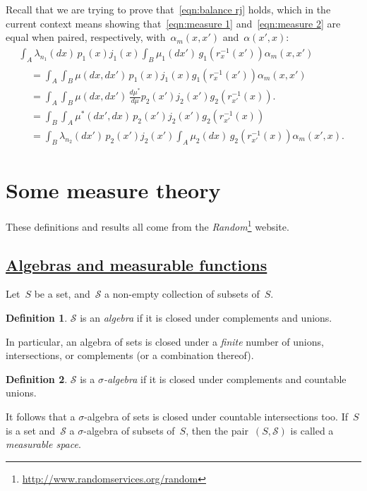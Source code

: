 \documentclass[11pt,a4paper]{article}
\newcommand\mc[1]{\mathcal{#1}}                  %
\theoremstyle{definition}
\newtheorem{defn}{Definition}
\begin{document}
Recall that we are trying to prove that~\eqref{eqn:balance rj} holds, which in
the current context means showing that~\eqref{eqn:measure 1}
and~\eqref{eqn:measure 2} are equal when paired, respectively,
with~$\alpha_m(x,x')$ and~$\alpha(x',x)$:
\begin{multline*}
  \int_A \lambda_{n_1}(dx)\,p_1(x)j_1(x)
      \int_B \mu_1(dx')\,g_1(r_x^{-1}(x'))\alpha_m(x,x') \\
  \begin{aligned}
  &= \int_A \int_B \mu(dx,dx')\,p_1(x)j_1(x)g_1(r_x^{-1}(x'))\alpha_m(x,x') \\
  &= \int_A \int_B \mu(dx,dx')\,\frac{d\mu^*}{d\mu}
      p_2(x')j_2(x')g_2(r_{x'}^{-1}(x)). \\
  &= \int_B \int_A \mu^*(dx',dx)\,p_2(x')j_2(x')g_2(r_{x'}^{-1}(x)) \\
  &= \int_B \lambda_{n_2}(dx')\,p_2(x')j_2(x')
      \int_A \mu_2(dx)\,g_2(r_{x'}^{-1}(x))\alpha_m(x',x).
  \end{aligned}
\end{multline*}

\section{Some measure theory} %
\label{sec:measure}

These definitions and results all come from the
\emph{Random}\footnote{\url{http://www.randomservices.org/random}} website.

\subsection %
  {\href{http://www.randomservices.org/random/foundations/Measure.html}
  {Algebras and measurable functions}}

Let~$S$ be a set, and~$\mc{S}$ a non-empty collection of subsets of~$S$.
\begin{defn}
$\mc{S}$ is an \emph{algebra} if it is closed under complements and unions.
\end{defn}
In particular, an algebra of sets is closed under a \emph{finite} number of
unions, intersections, or complements (or a combination thereof).

\begin{defn}
$\mc{S}$ is a \emph{$\sigma$-algebra} if it is closed under complements and
countable unions.
\end{defn}
It follows that a $\sigma$-algebra of sets is closed under countable
intersections too. If~$S$ is a set and~$\mc{S}$ a $\sigma$-algebra of subsets
of~$S$, then the pair~$(S,\mc{S})$ is called a \emph{measurable space}.
\end{document}
